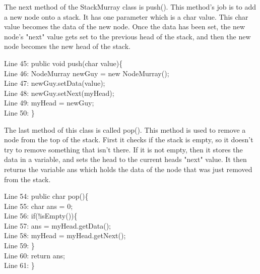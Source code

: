 \documentclass{article}
\begin{document}
\noindent
The next method of the StackMurray class is push(). This method's job is to add a new node onto a stack. It has one parameter which is a char value. This char value becomes the data of the new node. Once the data has been set, the new node's "next" value gets set to the previous head of the stack, and then the new node becomes the new head of the stack.

\vspace{2em}
Line 45: public void push(char value)\{\\
  	\hspace*{1.5em}Line 46:\hspace*{1em} NodeMurray newGuy = new NodeMurray();\\
  	\hspace*{1.5em}Line 47:\hspace*{1em} newGuy.setData(value);\\
  	\hspace*{1.5em}Line 48: \hspace*{1em}newGuy.setNext(myHead);\\
  	\hspace*{1.5em}Line 49: \hspace*{1em}myHead = newGuy;\\
    \hspace*{1.5em}Line 50: \}\\
\vspace{2em}

\noindent
The last method of this class is called pop(). This method is used to remove a node from the top of the stack. First it checks if the stack is empty, so it doesn't try to remove something that isn't there. If it is not empty, then it stores the data in a variable, and sets the head to the current heads "next" value. It then returns the variable ans which holds the data of the node that was just removed from the stack.

\vspace{2em}
Line 54: public char pop()\{\\
    \hspace*{1.5em}Line 55: \hspace*{1em}char ans = 0;\\
	\hspace*{1.5em}Line 56: \hspace*{1em}if(!isEmpty())\{\\
	\hspace*{1.5em}Line 57: \hspace*{2em}ans = myHead.getData();\\
	\hspace*{1.5em}Line 58: \hspace*{2em} myHead = myHead.getNext();\\
	\hspace*{1.5em}Line 59: \hspace*{1em} \}\\
	\hspace*{1.5em}Line 60: \hspace*{1em}return ans;\\
    \hspace*{1.5em}Line 61: \}\\
    \vspace{2em}
\end{document}
